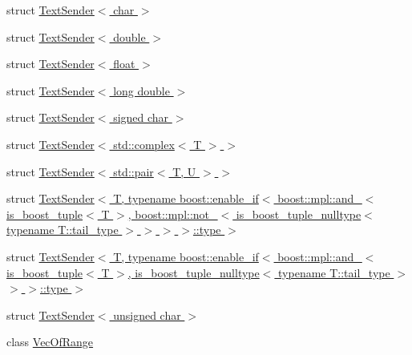 \begin{DoxyCompactItemize}
struct \hyperlink{structgnuplotio_1_1_text_sender_3_01char_01_4}{Text\+Sender$<$ char $>$}
\item 
struct \hyperlink{structgnuplotio_1_1_text_sender_3_01double_01_4}{Text\+Sender$<$ double $>$}
\item 
struct \hyperlink{structgnuplotio_1_1_text_sender_3_01float_01_4}{Text\+Sender$<$ float $>$}
\item 
struct \hyperlink{structgnuplotio_1_1_text_sender_3_01long_01double_01_4}{Text\+Sender$<$ long double $>$}
\item 
struct \hyperlink{structgnuplotio_1_1_text_sender_3_01signed_01char_01_4}{Text\+Sender$<$ signed char $>$}
\item 
struct \hyperlink{structgnuplotio_1_1_text_sender_3_01std_1_1complex_3_01_t_01_4_01_4}{Text\+Sender$<$ std\+::complex$<$ T $>$ $>$}
\item 
struct \hyperlink{structgnuplotio_1_1_text_sender_3_01std_1_1pair_3_01_t_00_01_u_01_4_01_4}{Text\+Sender$<$ std\+::pair$<$ T, U $>$ $>$}
\item 
struct \hyperlink{structgnuplotio_1_1_text_sender_3_01_t_00_01typename_01boost_1_1enable__if_3_01boost_1_1mpl_1_1ad1ac3a3da167856c52be6ae54ba2c114}{Text\+Sender$<$ T, typename boost\+::enable\+\_\+if$<$ boost\+::mpl\+::and\+\_\+$<$ is\+\_\+boost\+\_\+tuple$<$ T $>$, boost\+::mpl\+::not\+\_\+$<$ is\+\_\+boost\+\_\+tuple\+\_\+nulltype$<$ typename T\+::tail\+\_\+type $>$ $>$ $>$ $>$\+::type $>$}
\item 
struct \hyperlink{structgnuplotio_1_1_text_sender_3_01_t_00_01typename_01boost_1_1enable__if_3_01boost_1_1mpl_1_1ab6d6864cc1b3ed233c9f15134694f953}{Text\+Sender$<$ T, typename boost\+::enable\+\_\+if$<$ boost\+::mpl\+::and\+\_\+$<$ is\+\_\+boost\+\_\+tuple$<$ T $>$, is\+\_\+boost\+\_\+tuple\+\_\+nulltype$<$ typename T\+::tail\+\_\+type $>$ $>$ $>$\+::type $>$}
\item 
struct \hyperlink{structgnuplotio_1_1_text_sender_3_01unsigned_01char_01_4}{Text\+Sender$<$ unsigned char $>$}
\item 
class \hyperlink{classgnuplotio_1_1_vec_of_range}{Vec\+Of\+Range}
\end{DoxyCompactItemize}
